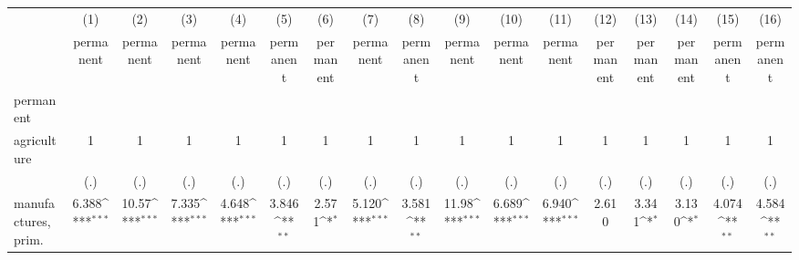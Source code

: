 {
\def\sym#1{\ifmmode^{#1}\else\(^{#1}\)\fi}
\begin{tabular}{l*{16}{c}}
\hline\hline
                    &\multicolumn{1}{c}{(1)}&\multicolumn{1}{c}{(2)}&\multicolumn{1}{c}{(3)}&\multicolumn{1}{c}{(4)}&\multicolumn{1}{c}{(5)}&\multicolumn{1}{c}{(6)}&\multicolumn{1}{c}{(7)}&\multicolumn{1}{c}{(8)}&\multicolumn{1}{c}{(9)}&\multicolumn{1}{c}{(10)}&\multicolumn{1}{c}{(11)}&\multicolumn{1}{c}{(12)}&\multicolumn{1}{c}{(13)}&\multicolumn{1}{c}{(14)}&\multicolumn{1}{c}{(15)}&\multicolumn{1}{c}{(16)}\\
                    &\multicolumn{1}{c}{permanent}&\multicolumn{1}{c}{permanent}&\multicolumn{1}{c}{permanent}&\multicolumn{1}{c}{permanent}&\multicolumn{1}{c}{permanent}&\multicolumn{1}{c}{permanent}&\multicolumn{1}{c}{permanent}&\multicolumn{1}{c}{permanent}&\multicolumn{1}{c}{permanent}&\multicolumn{1}{c}{permanent}&\multicolumn{1}{c}{permanent}&\multicolumn{1}{c}{permanent}&\multicolumn{1}{c}{permanent}&\multicolumn{1}{c}{permanent}&\multicolumn{1}{c}{permanent}&\multicolumn{1}{c}{permanent}\\
\hline
permanent           &                     &                     &                     &                     &                     &                     &                     &                     &                     &                     &                     &                     &                     &                     &                     &                     \\
agriculture         &           1         &           1         &           1         &           1         &           1         &           1         &           1         &           1         &           1         &           1         &           1         &           1         &           1         &           1         &           1         &           1         \\
                    &         (.)         &         (.)         &         (.)         &         (.)         &         (.)         &         (.)         &         (.)         &         (.)         &         (.)         &         (.)         &         (.)         &         (.)         &         (.)         &         (.)         &         (.)         &         (.)         \\
[1em]
manufactures, prim. &       6.388\sym{***}&       10.57\sym{***}&       7.335\sym{***}&       4.648\sym{***}&       3.846\sym{**} &       2.571\sym{*}  &       5.120\sym{***}&       3.581\sym{**} &       11.98\sym{***}&       6.689\sym{***}&       6.940\sym{***}&       2.610         &       3.341\sym{*}  &       3.130\sym{*}  &       4.074\sym{**} &       4.584\sym{**} \\

\end{tabular}}
